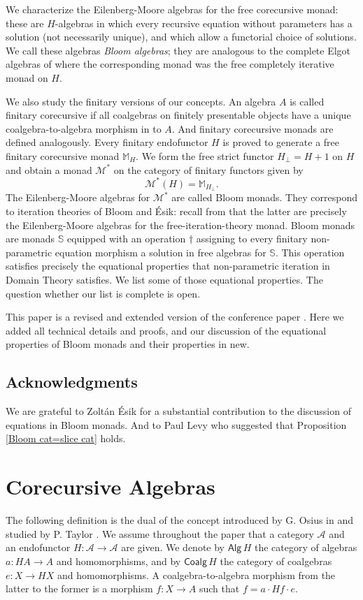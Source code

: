 \documentclass{LMCS}
\theoremstyle{plain}
\theoremstyle{definition}
\numberwithin{equation}{section}
\begin{document}
We characterize the Eilenberg-Moore algebras for the free corecursive monad:  these are $H$-algebras in which  every recursive equation without parameters has a solution (not necessarily unique), and which allow a functorial choice of solutions. We call these algebras \emph{Bloom algebras}; they are analogous to the complete Elgot algebras of \cite{amv3} where the corresponding monad was the free completely iterative monad on $H$.

We also study the finitary versions of our concepts. An algebra $A$ is
called finitary corecursive if all coalgebras on finitely presentable
objects have a unique coalgebra-to-algebra morphism in to $A$. And
finitary corecursive monads are defined analogously. Every finitary
endofunctor $H$ is proved to generate a free finitary corecursive
monad $\mathbb{M}_H$. We form the free strict functor $H_\bot=H+1$ on
$H$ and obtain a monad $\mathcal{M}^*$ on the category of finitary
functors given by
$$\mathcal{M}^*(H)=\mathbb{M}_{H_\bot}.$$ 
The Eilenberg-Moore algebras for $\mathcal{M}^*$ are called Bloom
monads. They correspond to iteration theories of Bloom and \'Esik:
recall from \cite{amv_what} that the latter are precisely the
Eilenberg-Moore algebras for the free-iteration-theory monad. Bloom
monads are monads $\mathbb{S}$ equipped with an operation $\dag$
assigning to every finitary non-parametric equation morphism a
solution in free algebras for $\mathbb{S}$. This operation satisfies
precisely the equational properties that non-parametric iteration in
Domain Theory satisfies. We list some of those equational
properties. The question whether our list is complete is open.

This paper is a revised and extended version of the conference paper
\cite{ahm11}. Here we added all technical details and proofs, and our
discussion of the equational properties of Bloom monads and their
properties in new.

\subsection*{Acknowledgments}
We are grateful to Zolt\'an \'Esik for a substantial contribution to the discussion of equations in Bloom monads. And to Paul Levy who suggested that  Proposition \ref{Bloom cat=slice cat} holds.






\section{Corecursive Algebras}
The following definition is the dual of the concept introduced by G. Osius in \cite{g} and studied by P. Taylor \cite{t,t2}. We assume throughout the paper that  a category $\mathcal A$ and an endofunctor $H:\mathcal A\rightarrow \mathcal A$ are given. We denote by $\mathsf{Alg}\, H$ the category of algebras $a:HA\rightarrow A$ and homomorphisms, and by $\mathsf{Coalg}\, H$ the category of coalgebras $e:X\rightarrow HX$ and homomorphisms. A coalgebra-to-algebra morphism from the latter to the former  is a morphism $f:X\rightarrow A$ such that $f=a\cdot Hf\cdot e$.
\end{document}
